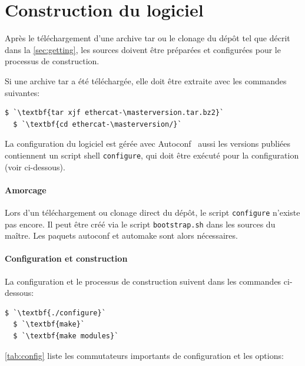 \documentclass[a4paper,12pt,BCOR6mm,bibtotoc,idxtotoc]{scrbook}
\newcommand{\masterversion}{1.5.2}
\begin{document}
\section{Construction du logiciel}

Apr\`es le t\'el\'echargement d'une archive tar ou le clonage du
d\'ep\^ot tel que d\'ecrit dans la \autoref{sec:getting}, les sources
doivent \^etre pr\'epar\'ees et configur\'ees pour le processus de
construction.

Si une archive tar a \'et\'e t\'el\'echarg\'ee, elle doit \^etre
extraite avec les commandes suivantes:

\begin{lstlisting}[gobble=2]
  $ `\textbf{tar xjf ethercat-\masterversion.tar.bz2}`
  $ `\textbf{cd ethercat-\masterversion/}`
\end{lstlisting}

La configuration du logiciel est g\'er\'ee avec
Autoconf~\cite{autoconf} aussi les versions publi\'ees contiennent un
script shell \lstinline+configure+, qui doit \^etre
ex\'ecut\'e pour la configuration (voir ci-dessous).

 \paragraph{Amorcage} Lors d'un t\'el\'echargement ou clonage
 direct du d\'ep\^ot, le script \lstinline+configure+ n'existe pas
 encore.  Il peut \^etre cr\'e\'e via le script
 \lstinline+bootstrap.sh+ dans les sources du ma\^itre. Les paquets
 autoconf et automake sont alors n\'ecessaires.

 \paragraph{Configuration et construction} La configuration
 et le processus de construction suivent dans les commandes
 ci-dessous:

\begin{lstlisting}[gobble=2]
  $ `\textbf{./configure}`
  $ `\textbf{make}`
  $ `\textbf{make modules}`
\end{lstlisting}

\autoref{tab:config} liste les commutateurs importants de
configuration et les options:
\end{document}
